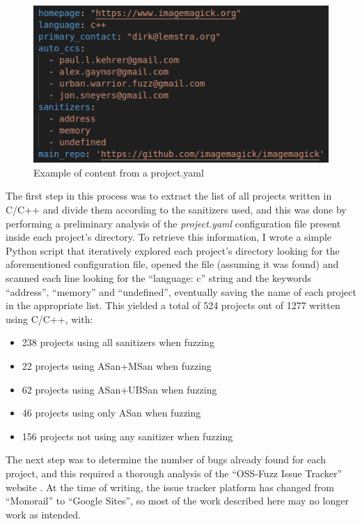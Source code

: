 \begin{figure}[h]
\centering
\includegraphics[scale=0.5]{foto/project_yaml.png}
\caption{Example of content from a project.yaml}
\label{fig:project_yaml}
\end{figure}

The first step in this process was to extract the list of all projects written in C/C++ and divide them according to the sanitizers used, and this was done by performing a preliminary analysis of the \textit{project.yaml} configuration file present inside each project's directory. To retrieve this information, I wrote a simple Python script that iteratively explored each project's directory looking for the aforementioned configuration file, opened the file (assuming it was found) and scanned each line looking for the ``language: c'' string and the keywords ``address'', ``memory'' and ``undefined'', eventually saving the name of each project in the appropriate list.
\newline \newline
This yielded a total of 524 projects out of 1277 written using C/C++, with: 
\begin{itemize}
    \item 238 projects using all sanitizers when fuzzing
    \item 22 projects using ASan+MSan when fuzzing
    \item 62 projects using ASan+UBSan when fuzzing
    \item 46 projects using only ASan when fuzzing
    \item 156 projects not using any sanitizer when fuzzing
\end{itemize}

The next step was to determine the number of bugs already found for each project, and this required a thorough analysis of the ``OSS-Fuzz Issue Tracker'' website \cite{ossfuzz_bugtracker}. At the time of writing, the issue tracker platform has changed from ``Monorail'' to ``Google Sites'', so most of the work described here may no longer work as intended.

